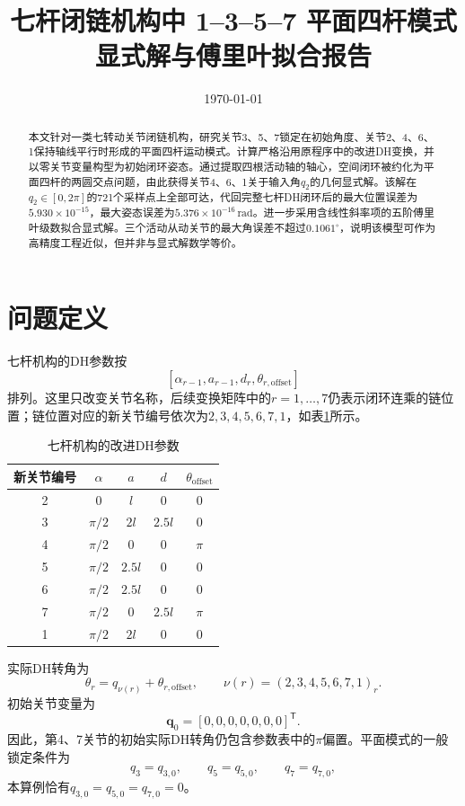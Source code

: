 \documentclass[UTF8,12pt,a4paper]{ctexart}
\title{\textbf{七杆闭链机构中 1--3--5--7 平面四杆模式\\显式解与傅里叶拟合报告}}
\author{}
\date{\today}
\begin{document}
\maketitle
\tableofcontents
\newpage

\begin{abstract}
本文针对一类七转动关节闭链机构，研究关节3、5、7锁定在初始角度、关节2、4、6、1保持轴线平行时形成的平面四杆运动模式。计算严格沿用原程序中的改进DH变换，并以零关节变量构型为初始闭环姿态。通过提取四根活动轴的轴心，空间闭环被约化为平面四杆的两圆交点问题，由此获得关节4、6、1关于输入角$q_2$的几何显式解。该解在$q_2\in[0,2\pi]$的721个采样点上全部可达，代回完整七杆DH闭环后的最大位置误差为$5.930\times10^{-15}$，最大姿态误差为$5.376\times10^{-16}\,\mathrm{rad}$。进一步采用含线性斜率项的五阶傅里叶级数拟合显式解。三个活动从动关节的最大角误差不超过$0.1061^\circ$，说明该模型可作为高精度工程近似，但并非与显式解数学等价。
\end{abstract}

\section{问题定义}

七杆机构的DH参数按
\[
[\alpha_{r-1},a_{r-1},d_r,\theta_{r,\mathrm{offset}}]
\]
排列。这里只改变关节名称，后续变换矩阵中的$r=1,\ldots,7$仍表示闭环连乘的链位置；链位置对应的新关节编号依次为$2,3,4,5,6,7,1$，如表\ref{tab:dh}所示。

\begin{table}[H]
\centering
\caption{七杆机构的改进DH参数}
\label{tab:dh}
\begin{tabular}{ccccc}
\toprule
新关节编号 & $\alpha$ & $a$ & $d$ & $\theta_{\mathrm{offset}}$\\
\midrule
2 & $0$ & $l$ & $0$ & $0$\\
3 & $\pi/2$ & $2l$ & $2.5l$ & $0$\\
4 & $\pi/2$ & $0$ & $0$ & $\pi$\\
5 & $\pi/2$ & $2.5l$ & $0$ & $0$\\
6 & $\pi/2$ & $2.5l$ & $0$ & $0$\\
7 & $\pi/2$ & $0$ & $2.5l$ & $\pi$\\
1 & $\pi/2$ & $2l$ & $0$ & $0$\\
\bottomrule
\end{tabular}
\end{table}

实际DH转角为
\[
\theta_r=q_{\nu(r)}+\theta_{r,\mathrm{offset}},\qquad \nu(r)=(2,3,4,5,6,7,1)_r.
\]
初始关节变量为
\[
\bm q_0=[0,0,0,0,0,0,0]^{\mathsf T}.
\]
因此，第4、7关节的初始实际DH转角仍包含参数表中的$\pi$偏置。平面模式的一般锁定条件为
\[
q_3=q_{3,0},\qquad q_5=q_{5,0},\qquad q_7=q_{7,0},
\]
本算例恰有$q_{3,0}=q_{5,0}=q_{7,0}=0$。
\end{document}
